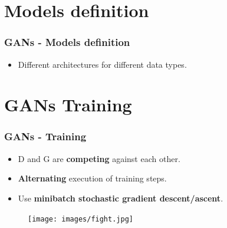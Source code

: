 \documentclass{beamer}
\begin{document}
\section{Models definition}

\begin{frame}
\frametitle{GANs - Models definition}
\begin{itemize}
\item Different architectures for different data types.
\begin{itemize}
\end{itemize}
\end{itemize}



\end{frame}

\section{GANs Training}

\begin{frame}
\frametitle{GANs - Training}
\begin{itemize}
\item D and G are \textbf{competing} against each other.
\item \textbf{Alternating} execution of training steps.
\item Use \textbf{minibatch stochastic gradient descent/ascent}.
\end{itemize}
\begin{figure}
\centering
\texttt{[image: images/fight.jpg]}
\end{figure}
\end{frame}
\end{document}
